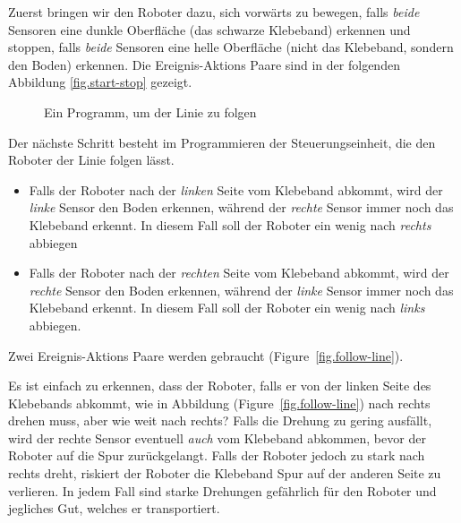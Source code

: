 Zuerst bringen wir den Roboter dazu,  sich vorwärts zu bewegen,
falls \emph{beide} Sensoren eine dunkle Oberfläche (das schwarze Klebeband) erkennen 
und stoppen, falls \emph{beide} Sensoren eine helle Oberfläche (nicht das Klebeband, sondern den Boden) erkennen.
Die Ereignis-Aktions Paare sind in der folgenden Abbildung \cref{fig.start-stop} gezeigt.


\begin{figure}
	\hfill
	\caption{Ein Programm, um der Linie zu folgen}
\end{figure}


Der nächste Schritt besteht im Programmieren der Steuerungseinheit,
die den Roboter der Linie folgen lässt.

\begin{itemize}

\item Falls der Roboter nach der \emph{linken} Seite vom Klebeband abkommt,
wird der \emph{linke} Sensor den Boden erkennen,
während der \emph{rechte} Sensor immer noch das Klebeband erkennt.
In diesem Fall soll der Roboter ein wenig nach \emph{rechts} abbiegen

\item Falls der Roboter nach der \emph{rechten} Seite vom Klebeband abkommt,
wird der \emph{rechte} Sensor den Boden erkennen,
während der \emph{linke} Sensor immer noch das Klebeband erkennt.
In diesem Fall soll der Roboter ein wenig nach \emph{links} abbiegen.
\end{itemize}

Zwei Ereignis-Aktions Paare werden gebraucht  (Figure~\ref{fig.follow-line}).


Es ist einfach zu erkennen,
dass der Roboter, falls er von der linken Seite des Klebebands abkommt,
wie in Abbildung (Figure~\ref{fig.follow-line}) nach rechts drehen muss,
aber wie weit nach rechts? Falls die Drehung zu gering ausfällt,
wird der rechte Sensor eventuell \emph{auch} vom Klebeband abkommen,
bevor der Roboter auf die Spur zurückgelangt.
Falls der Roboter jedoch zu stark nach rechts dreht,
riskiert der Roboter die Klebeband Spur auf der anderen Seite zu verlieren.
In jedem Fall sind starke Drehungen gefährlich für den Roboter und jegliches Gut,
welches er transportiert.

